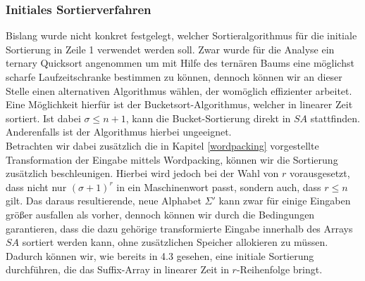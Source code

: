 \subsubsection{Initiales Sortierverfahren}
Bislang wurde nicht konkret festgelegt, welcher Sortieralgorithmus für die initiale Sortierung in Zeile 1 verwendet werden soll. Zwar wurde für die Analyse ein ternary Quicksort angenommen um mit Hilfe des ternären Baums eine möglichst scharfe Laufzeitschranke bestimmen zu können, dennoch können wir an dieser Stelle einen alternativen Algorithmus wählen, der womöglich effizienter arbeitet.\\
Eine Möglichkeit hierfür ist der Bucketsort-Algorithmus, welcher in linearer Zeit sortiert. Ist dabei $\sigma \leq n+1$, kann die Bucket-Sortierung direkt in $SA$ stattfinden. Anderenfalls ist der Algorithmus hierbei ungeeignet.\\
Betrachten wir dabei zusätzlich die in Kapitel \ref{wordpacking} vorgestellte Transformation der Eingabe mittels Wordpacking, können wir die Sortierung zusätzlich beschleunigen. Hierbei wird jedoch bei der Wahl von $r$ vorausgesetzt, dass nicht nur $(\sigma + 1)^r$ in ein Maschinenwort passt, sondern auch, dass $r \leq  n$ gilt. Das daraus resultierende, neue Alphabet $\Sigma'$ kann zwar für einige Eingaben größer ausfallen als vorher, dennoch können wir durch die Bedingungen garantieren, dass die dazu gehörige transformierte Eingabe innerhalb des Arrays $SA$ sortiert werden kann, ohne zusätzlichen Speicher allokieren zu müssen. Dadurch können wir, wie bereits in 4.3 gesehen, eine initiale Sortierung durchführen, die das Suffix-Array in linearer Zeit in $r$-Reihenfolge bringt.